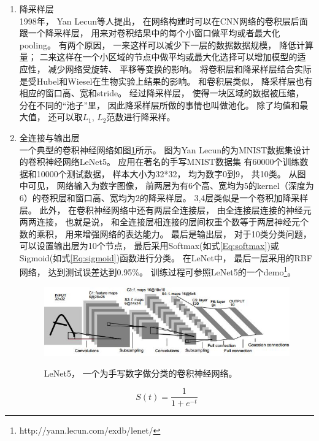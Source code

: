 \begin{enumerate}
\item 降采样层\\
1998年， Yan Lecun等人提出， 在网络构建时可以在CNN网络的卷积层后面跟一个降采样层， 用来对卷积结果中的每个小窗口做平均或者最大化pooling。 有两个原因， 一来这样可以减少下一层的数据数据规模， 降低计算量； 二来这样在一个小区域的节点中做平均或最大化选择可以增加模型的适应性， 减少网络受旋转、 平移等变换的影响。 将卷积层和降采样层结合实际是受Hubel和Wiesel在生物实验上结果的影响\cite{hubel1962receptive}。 和卷积层类似， 降采样层也有相应的窗口高、宽和stride。 经过降采样层， 使得一块区域的数据被压缩， 分在不同的“池子”里， 因此降采样层所做的事情也叫做池化。 除了均值和最大值， 还可以取$L_1$, $L_2$范数进行降采样。



\item 全连接与输出层\\
一个典型的卷积神经网络如图\ref{fig:lenet}所示。 图为Yan Lecun的为MNIST数据集设计的卷积神经网络LeNet5\cite{lecun1998gradient}。 应用在著名的手写MNIST数据集\cite{lecun1998mnist} 有60000个训练数据和10000个测试数据， 样本大小为32*32， 均为数字0到9， 共10类。 从图中可见， 网络输入为数字图像， 前两层为有6个高、宽均为5的kernel（深度为6）的卷积层和窗口高、宽均为2的降采样层。 3,4层类似是一个卷积加降采样层。 此外， 在卷积神经网络中还有两层全连接层， 由全连接层连接的神经元两两连接， 也就是说， 和全连接层相连接的层间权重个数等于两层神经元个数的乘积， 用来增强网络的表达能力。 最后是输出层， 对于10类分类问题， 可以设置输出层为10个节点， 最后采用Softmax(如式\ref{Eq:softmax})或Sigmoid(如式\ref{Eq:sigmoid})函数进行分类。 在LeNet中， 最后一层采用的RBF网络， 达到测试误差达到0.95\%。 训练过程可参照LeNet5的一个demo\footnote{http://yann.lecun.com/exdb/lenet/}。

\begin{figure}[htb]
  \centering
  \includegraphics[scale=0.7]{Pictures/CNN/lenet.jpg}\\
  \caption{LeNet5， 一个为手写数字做分类的卷积神经网络。\cite{lecun1998gradient}}\label{fig:lenet}
\end{figure}


\begin{equation}
S(t)=\frac{1}{1+e^{-t}}\label{Eq:sigmoid}
\end{equation}


\end{enumerate}
